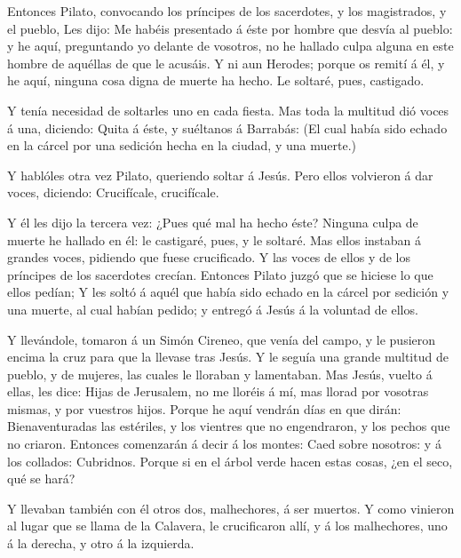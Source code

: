  Entonces Pilato, convocando los príncipes de los
sacerdotes, y los magistrados, y el pueblo,  Les dijo: Me
habéis presentado á éste por hombre que desvía al pueblo: y he aquí,
preguntando yo delante de vosotros, no he hallado culpa alguna en este
hombre de aquéllas de que le acusáis.  Y ni aun Herodes;
porque os remití á él, y he aquí, ninguna cosa digna de muerte ha hecho.
 Le soltaré, pues, castigado.

 Y tenía necesidad de soltarles uno en cada fiesta.
 Mas toda la multitud dió voces á una, diciendo: Quita á
éste, y suéltanos á Barrabás:  (El cual había sido echado
en la cárcel por una sedición hecha en la ciudad, y una muerte.)

 Y hablóles otra vez Pilato, queriendo soltar á Jesús.
 Pero ellos volvieron á dar voces, diciendo: Crucifícale,
crucifícale.

 Y él les dijo la tercera vez: ¿Pues qué mal ha hecho éste?
Ninguna culpa de muerte he hallado en él: le castigaré, pues, y le
soltaré.  Mas ellos instaban á grandes voces, pidiendo que
fuese crucificado. Y las voces de ellos y de los príncipes de los
sacerdotes crecían.  Entonces Pilato juzgó que se hiciese
lo que ellos pedían;  Y les soltó á aquél que había sido
echado en la cárcel por sedición y una muerte, al cual habían pedido; y
entregó á Jesús á la voluntad de ellos.

 Y llevándole, tomaron á un Simón Cireneo, que venía del
campo, y le pusieron encima la cruz para que la llevase tras Jesús.
 Y le seguía una grande multitud de pueblo, y de mujeres,
las cuales le lloraban y lamentaban.  Mas Jesús, vuelto á
ellas, les dice: Hijas de Jerusalem, no me lloréis á mí, mas llorad por
vosotras mismas, y por vuestros hijos.  Porque he aquí
vendrán días en que dirán: Bienaventuradas las estériles, y los vientres
que no engendraron, y los pechos que no criaron.  Entonces
comenzarán á decir á los montes: Caed sobre nosotros: y á los collados:
Cubridnos.  Porque si en el árbol verde hacen estas cosas,
¿en el seco, qué se hará?

 Y llevaban también con él otros dos, malhechores, á ser
muertos.  Y como vinieron al lugar que se llama de la
Calavera, le crucificaron allí, y á los malhechores, uno á la derecha, y
otro á la izquierda.


